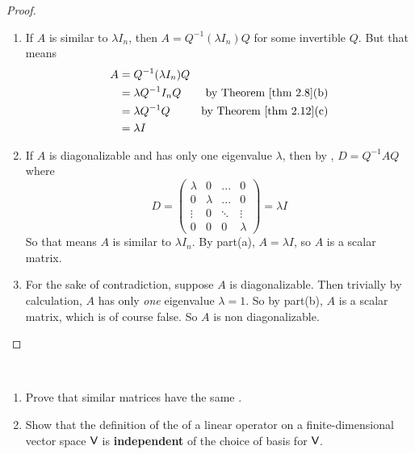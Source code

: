 \begin{proof} \ 

\begin{enumerate}
\item If \(A\) is similar to \(\lambda I_n\), then \(A = Q^{-1} (\lambda I_n) Q\) for some invertible \(Q\).
But that means
\begin{align*}
    A & = Q^{-1} (\lambda I_n) Q \\
      & = \lambda Q^{-1} I_n Q & \text{by \THM{2.8}(b)} \\
      & = \lambda Q^{-1} Q & \text{by \THM{2.12}(c)} \\
      & = \lambda I
\end{align*}

\item If \(A\) is diagonalizable and has only one eigenvalue \(\lambda\), then by , \(D = Q^{-1} A Q\) where
\[
    D = \begin{pmatrix}
        \lambda & 0       & ...    & 0 \\
        0       & \lambda & ...    & 0 \\
        \vdots  & 0       & \ddots & \vdots \\
        0       & 0       & 0      & \lambda
    \end{pmatrix} = \lambda I
\]
So that means \(A\) is similar to \(\lambda I_n\).
By part(a), \(A = \lambda I\), so \(A\) is a scalar matrix.

\item
For the sake of contradiction, suppose \(A\) is diagonalizable.
Then trivially by calculation, \(A\) has only \emph{one} eigenvalue \(\lambda = 1\).
So by part(b), \(A\) is a scalar matrix, which is of course false.
So \(A\) is non diagonalizable.
\end{enumerate}
\end{proof}

\begin{exercise} \label{exercise 5.1.13} \ 

\begin{enumerate}
\item Prove that similar matrices have the same \CPOLY{}.
\item Show that the definition of the \CPOLY{} of a linear operator on a finite-dimensional vector space \(\textsf{V}\) is \textbf{independent} of
the choice of basis for \(\textsf{V}\).
\end{enumerate}
\end{exercise}

